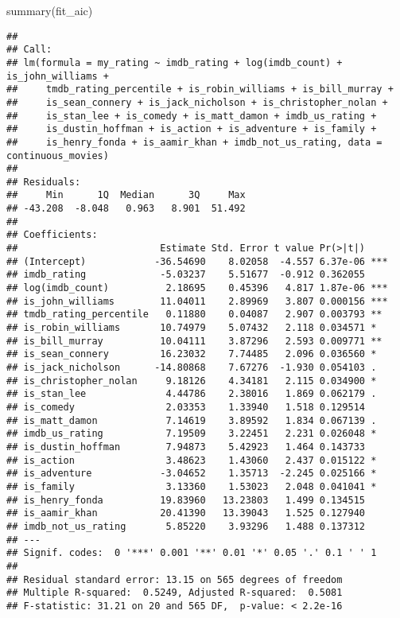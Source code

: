 \documentclass[
]{article}
\newenvironment{Shaded}{\begin{snugshade}}{\end{snugshade}}
\newcommand{\FunctionTok}[1]{\textcolor[rgb]{0.00,0.00,0.00}{#1}}
\newcommand{\NormalTok}[1]{#1}
\begin{document}
\begin{Shaded}
\begin{Highlighting}[]
\FunctionTok{summary}\NormalTok{(fit\_aic)}
\end{Highlighting}
\end{Shaded}

\begin{verbatim}
## 
## Call:
## lm(formula = my_rating ~ imdb_rating + log(imdb_count) + is_john_williams + 
##     tmdb_rating_percentile + is_robin_williams + is_bill_murray + 
##     is_sean_connery + is_jack_nicholson + is_christopher_nolan + 
##     is_stan_lee + is_comedy + is_matt_damon + imdb_us_rating + 
##     is_dustin_hoffman + is_action + is_adventure + is_family + 
##     is_henry_fonda + is_aamir_khan + imdb_not_us_rating, data = continuous_movies)
## 
## Residuals:
##     Min      1Q  Median      3Q     Max 
## -43.208  -8.048   0.963   8.901  51.492 
## 
## Coefficients:
##                         Estimate Std. Error t value Pr(>|t|)    
## (Intercept)            -36.54690    8.02058  -4.557 6.37e-06 ***
## imdb_rating             -5.03237    5.51677  -0.912 0.362055    
## log(imdb_count)          2.18695    0.45396   4.817 1.87e-06 ***
## is_john_williams        11.04011    2.89969   3.807 0.000156 ***
## tmdb_rating_percentile   0.11880    0.04087   2.907 0.003793 ** 
## is_robin_williams       10.74979    5.07432   2.118 0.034571 *  
## is_bill_murray          10.04111    3.87296   2.593 0.009771 ** 
## is_sean_connery         16.23032    7.74485   2.096 0.036560 *  
## is_jack_nicholson      -14.80868    7.67276  -1.930 0.054103 .  
## is_christopher_nolan     9.18126    4.34181   2.115 0.034900 *  
## is_stan_lee              4.44786    2.38016   1.869 0.062179 .  
## is_comedy                2.03353    1.33940   1.518 0.129514    
## is_matt_damon            7.14619    3.89592   1.834 0.067139 .  
## imdb_us_rating           7.19509    3.22451   2.231 0.026048 *  
## is_dustin_hoffman        7.94873    5.42923   1.464 0.143733    
## is_action                3.48623    1.43060   2.437 0.015122 *  
## is_adventure            -3.04652    1.35713  -2.245 0.025166 *  
## is_family                3.13360    1.53023   2.048 0.041041 *  
## is_henry_fonda          19.83960   13.23803   1.499 0.134515    
## is_aamir_khan           20.41390   13.39043   1.525 0.127940    
## imdb_not_us_rating       5.85220    3.93296   1.488 0.137312    
## ---
## Signif. codes:  0 '***' 0.001 '**' 0.01 '*' 0.05 '.' 0.1 ' ' 1
## 
## Residual standard error: 13.15 on 565 degrees of freedom
## Multiple R-squared:  0.5249, Adjusted R-squared:  0.5081 
## F-statistic: 31.21 on 20 and 565 DF,  p-value: < 2.2e-16
\end{verbatim}
\end{document}
